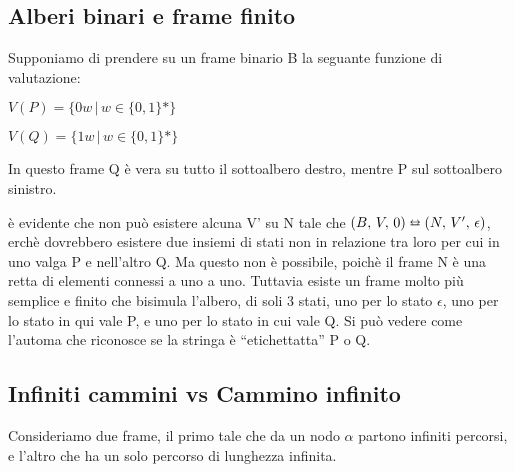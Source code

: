 \subsection{Alberi binari e frame finito}

Supponiamo di prendere su un frame binario B la seguante funzione
di valutazione:

$V(P)=\{0w\,|\, w\in\{0,1\}*\}$

$V(Q)=\{1w\,|\, w\in\{0,1\}*\}$

In questo frame Q è vera su tutto il sottoalbero destro, mentre P
sul sottoalbero sinistro.

è evidente che non può esistere alcuna V' su N tale che $(B,\, V,\,0)\leftrightarroweq(N,\, V',\,\epsilon)$,
erchè dovrebbero esistere due insiemi di stati non in relazione tra
loro per cui in uno valga P e nell'altro Q. Ma questo non è possibile,
poichè il frame N è una retta di elementi connessi a uno a uno. Tuttavia
esiste un frame molto più semplice e finito che bisimula l'albero,
di soli 3 stati, uno per lo stato $\epsilon$, uno per lo stato in
qui vale P, e uno per lo stato in cui vale Q. Si può vedere come l'automa
che riconosce se la stringa è ``etichettatta'' P o Q.

\begin{center}  \end{center} 


\subsection{Infiniti cammini vs Cammino infinito}

Consideriamo due frame, il primo tale che da un nodo $\alpha$ partono
infiniti percorsi, e l'altro che ha un solo percorso di lunghezza
infinita. 


